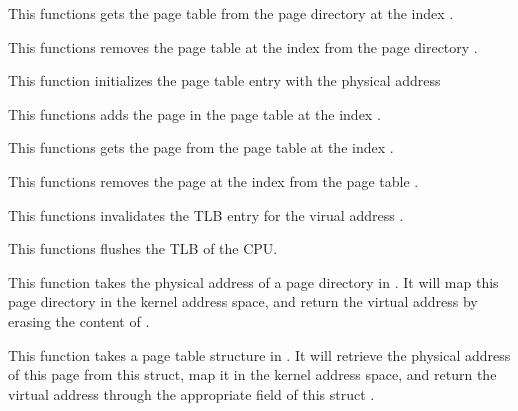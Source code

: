 {
  This functions gets the page table  from the page directory
   at the index .
}

{
  This functions removes the page table at the index  from the
  page directory .
}

{
  This function initializes the page table entry  with the
  physical address 
}

{
  This functions adds the page  in the page table
   at the index .
}

{
  This functions gets the page  from the page table
   at the index .
}

{
  This functions removes the page at the index  from the
  page table .
}

{
  This functions invalidates the TLB entry for the virual address
  .
}

{
  This functions flushes the TLB of the CPU.
}

{
  This function takes the physical address of a page directory in .
  It will map this page directory in the kernel address space, and return
  the virtual address by erasing the content of .
}

{
  This function takes a page table structure in . It will retrieve
  the physical address of this page from this struct, map it in the kernel address
  space, and return the virtual address through the appropriate field of this
  struct .
}

